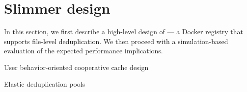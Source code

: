 \section{Slimmer design}
\label{sec:slimmer}

%
In this section, we first describe a high-level design of \emph{\sysname}---
a Docker registry that supports file-level deduplication.
We then proceed with a simulation-based evaluation of the expected performance
implications.



%
User behavior-oriented cooperative cache design

%

Elastic deduplication pools